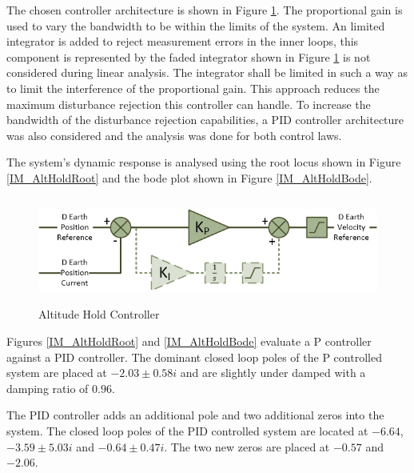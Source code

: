 	 The chosen controller architecture is shown in Figure \ref{IM_AltHoldController}. The proportional gain is used to vary the bandwidth to be within the limits of the system. An limited integrator is added to reject measurement errors in the inner loops, this component is represented by the faded integrator shown in Figure \ref{IM_AltHoldController} is not considered during linear analysis. The integrator shall be limited in such a way as to limit the interference of the proportional gain. This approach reduces the maximum disturbance rejection this controller can handle. To increase the bandwidth of the disturbance rejection capabilities, a PID controller architecture was also considered and the analysis was done for both control laws. 
	 
	 The system's dynamic response is analysed using the root locus shown in Figure \ref{IM_AltHoldRoot} and the bode plot shown in Figure \ref{IM_AltHoldBode}.
	 
	 \begin{figure}[H]
	 	\centering
	 	\includegraphics[height = 3.5cm]{../References/Diagrams/AltHoldController.jpg}
	 	\caption{Altitude Hold Controller}
	 	\label{IM_AltHoldController}
	 \end{figure}
	 
	 Figures \ref{IM_AltHoldRoot} and \ref{IM_AltHoldBode} evaluate a P controller against a PID controller. The dominant closed loop poles of the P controlled system are placed at $-2.03 \pm 0.58i$ and are slightly under damped with a damping ratio of $0.96$. 

	 The PID controller adds an additional pole and two additional zeros into the system. The closed loop poles of the PID controlled system are located at $-6.64$, $-3.59 \pm 5.03i$ and $-0.64 \pm 0.47i$. The two new zeros are placed at $-0.57$ and $-2.06$.
	 

